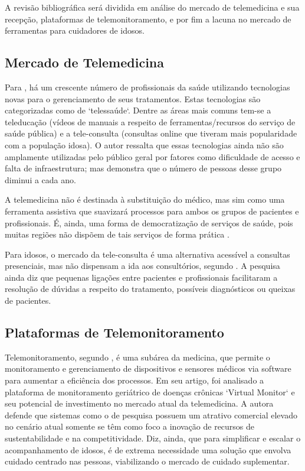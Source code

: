 \documentclass[
	article,			%
	12pt,				%
	oneside,			%
	a4paper,			%
    BIBLATEX,           %
	english,			%
	brazil,				%
	sumario=tradicional
	]{abntex2}
\begin{document}
A revisão bibliográfica será dividida em análise do mercado de telemedicina e sua recepção, plataformas de telemonitoramento, e por fim a lacuna no mercado de ferramentas para cuidadores de idosos.

\subsection{Mercado de Telemedicina}

Para , há um crescente número de profissionais da saúde utilizando tecnologias novas para o gerenciamento de seus tratamentos. Estas tecnologias são categorizadas como de `telessaúde`. Dentre as áreas mais comuns tem-se a teleducação (vídeos de manuais a respeito de ferramentas/recursos do serviço de saúde pública) e a tele-consulta (consultas online que tiveram mais popularidade com a população idosa). O autor ressalta que essas tecnologias ainda não são amplamente utilizadas pelo público geral por fatores como dificuldade de acesso e falta de infraestrutura; mas demonstra que o número de pessoas desse grupo diminui a cada ano.

A telemedicina não é destinada à substituição do médico, mas sim como uma ferramenta assistiva que suavizará processos para ambos os grupos de pacientes e profissionais. É, ainda, 
uma forma de democratização de serviços de saúde, pois muitas regiões não dispõem de tais serviços de forma prática \cite{Schaefer2023telemedicina}.

Para idosos, o mercado da tele-consulta é uma alternativa acessível a consultas presenciais, mas não dispensam a ida aos consultórios, segundo \cite{quirino2023percepcao}. A pesquisa ainda diz que pequenas ligações entre pacientes e profissionais facilitaram a resolução de dúvidas a respeito do tratamento, possíveis diagnósticos ou queixas de pacientes.

\subsection{Plataformas de Telemonitoramento}

Telemonitoramento, segundo , é uma subárea da medicina, que permite o monitoramento e gerenciamento de dispositivos e sensores médicos via software para aumentar a eficiência dos processos. Em seu artigo, foi analisado a plataforma de monitoramento geriátrico de doenças crônicas `Virtual Monitor` e seu potencial de investimento no mercado atual da telemedicina. A autora defende que sistemas como o de pesquisa possuem um atrativo comercial elevado no cenário atual somente se têm como foco a inovação de recursos de sustentabilidade e na competitividade. Diz, ainda, que para simplificar e escalar o acompanhamento de idosos, é de extrema necessidade uma solução que envolva cuidado centrado nas pessoas, viabilizando o mercado de cuidado suplementar.
\end{document}
